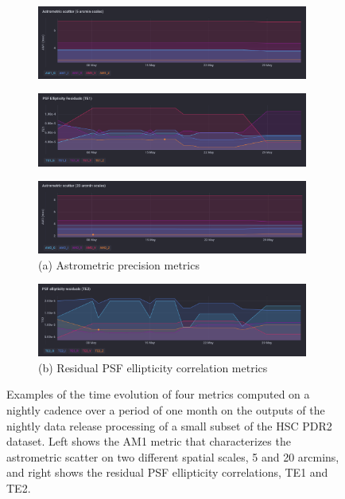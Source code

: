 \begin{figure}[ht]
\begin{subfigure}{.5\textwidth}
    \centering
    \includegraphics[width=0.98\textwidth]{figures/ci_metric_AM1_5}
\end{subfigure}
\begin{subfigure}{.5\textwidth}
    \centering
    \includegraphics[width=0.98\textwidth]{figures/ci_metric_TE1}
\end{subfigure}
\par\medskip 
\begin{subfigure}{.5\textwidth}
    \centering
    \includegraphics[width=0.98\textwidth]{figures/ci_metric_AM1_20}
     \caption[\small]{(a) Astrometric precision metrics}
\end{subfigure}
\begin{subfigure}{.5\textwidth}
    \centering
    \includegraphics[width=0.98\textwidth]{figures/ci_metric_TE2}
    \caption[\small]{(b) Residual PSF ellipticity correlation metrics}
\end{subfigure}
\par\medskip 
\caption{\label{fig:ci_metrics}
Examples of the time evolution of four \faro metrics computed on a nightly cadence over a period of one month on the outputs of the nightly data release processing of a small subset of the HSC PDR2 dataset.  
Left shows the AM1 metric that characterizes the astrometric scatter on two different spatial scales, 5 and 20 arcmins, and right shows the residual PSF ellipticity correlations, TE1 and TE2. }
\end{figure}

